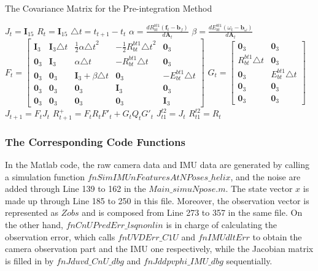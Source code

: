 \documentclass[12pt]{article}   %
\begin{document}
\begin{algorithm}
\caption{The Covariance Matrix for the Pre-integration Method}
\label{algm:preint1_cov}
\begin{algorithmic}%
\STATE $J_t = \textbf{I}_{15}$ 
\STATE $R_t = \textbf{I}_{15}$ 
\STATE $\triangle t =  t_{t+1} - t_t$ 
\STATE $\alpha = \frac{d R^{bt1}_{bt} (\textbf{f}_t - \textbf{b}_f)}{d \textbf{A}_t}$
\STATE $\beta = \frac{d E^{bt1}_{bt} (\omega_t - \textbf{b}_\omega)}{d \textbf{A}_t}$
\STATE $F_t = \begin{bmatrix} \textbf{I}_3 & \textbf{I}_3 \triangle t & \frac{1}{2}\alpha {\triangle t}^2 & -\frac{1}{2} R^{bt1}_{bt} {\triangle t}^2 & \textbf{0}_3 \\ \textbf{0}_3 & \textbf{I}_3  & \alpha \triangle t & -R^{bt1}_{bt} \triangle t & \textbf{0}_3 \\ \textbf{0}_3 & \textbf{0}_3 & \textbf{I}_3 + \beta \triangle t & \textbf{0}_3 & -E^{bt1}_{bt} \triangle t \\ \textbf{0}_3 & \textbf{0}_3 & \textbf{0}_3 & \textbf{I}_3 & \textbf{0}_3 \\ \textbf{0}_3 & \textbf{0}_3 & \textbf{0}_3 & \textbf{0}_3 & \textbf{I}_3\end{bmatrix}$
\STATE $G_t = \begin{bmatrix} \textbf{0}_3 & \textbf{0}_3 \\ R^{bt1}_{bt} \triangle t & \textbf{0}_3 \\ \textbf{0}_3 & E^{bt1}_{bt} \triangle t \\ \textbf{0}_3 & \textbf{0}_3 \\ \textbf{0}_3 & \textbf{0}_3 \end{bmatrix}$
\STATE $J_{t+1} = F_{t} J_t$ 
\STATE $R_{t+1}^+ = F_{t} R_t F'_{t} + G_t Q_t G'_t$ 
\ENDFOR
\STATE $J^{t2}_{t1} = J_{t}$
\STATE $R^{t2}_{t1} = R_{t}$
\end{algorithmic}
\end{algorithm}





\subsubsection{The Corresponding Code Functions}

In the Matlab code, the raw camera data and IMU data are generated by calling a simulation function $fnSimIMUnFeaturesAtNPoses\_helix$, and the noise are added through Line 139 to 162 in the $Main\_simuNpose.m$. The state vector $x$ is made up through Line 185 to 250 in this file. Moreover, the observation vector is represented as $Zobs$ and is composed from Line 273 to 357 in the same file. On the other hand, $fnCnUPredErr\_lsqnonlin$ is in charge of calculating the observation error, which calls $fnUVDErr\_C1U$ and $fnIMUdltErr$ to obtain the camera observation part and the IMU one respectively, while the Jacobian matrix is filled in by $fnJduvd\_CnU\_dbg$ and $fnJddpvphi\_IMU\_dbg$ sequentially. 
\end{document}

